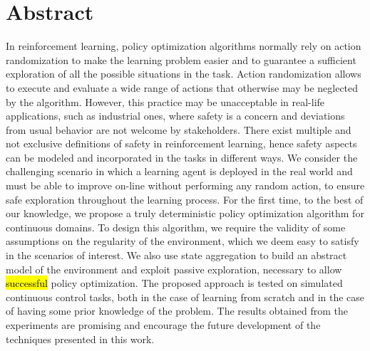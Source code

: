 
\begingroup
\let\clearpage\relax
\let\cleardoublepage\relax
\let\cleardoublepage\relax

\chapter*{Abstract}
In reinforcement learning, policy optimization algorithms normally rely on action randomization to make the learning problem easier and to guarantee a sufficient exploration of all the possible situations in the task. Action randomization allows to execute and evaluate a wide range of actions that otherwise may be neglected by the algorithm. However, this practice may be unacceptable in real-life applications, such as industrial ones, where safety is a concern and deviations from usual behavior are not welcome by stakeholders. There exist multiple and not exclusive definitions of safety in reinforcement learning, hence safety aspects can be modeled and incorporated in the tasks in different ways. We consider the challenging scenario in which a learning agent is deployed in the real world and must be able to improve on-line without performing any random action, to ensure safe exploration throughout the learning process. For the first time, to the best of our knowledge, we propose a truly deterministic policy optimization algorithm for continuous domains. To design this algorithm, we require the validity of some assumptions on the regularity of the environment, which we deem easy to satisfy in the scenarios of interest. We also use state aggregation to build an abstract model of the environment and exploit passive exploration, necessary to allow \hl{successful} policy optimization. The proposed approach is tested on simulated continuous control tasks, both in the case of learning from scratch and in the case of having some prior knowledge of the problem. The results obtained from the experiments are promising and encourage the future development of the techniques presented in this work.

\vfill
\newpage
{}
